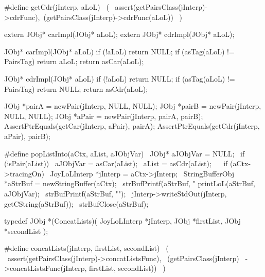 #define getCdr(jInterp, aLoL)               \
  (                                         \
    assert(getPairsClass(jInterp)->cdrFunc),\
    (getPairsClass(jInterp)->cdrFunc(aLoL)) \
  )
\stopCHeader

\startCHeader
extern JObj* carImpl(JObj* aLoL);
extern JObj* cdrImpl(JObj* aLoL);
\stopCHeader
{}

\startCCode
JObj* carImpl(JObj* aLoL) {
  if (!aLoL) return NULL;
  if (asTag(aLoL) != PairsTag) return aLoL;
  return asCar(aLoL);
}

JObj* cdrImpl(JObj* aLoL) {
  if (!aLoL) return NULL;
  if (asTag(aLoL) != PairsTag) return NULL;
  return asCdr(aLoL);
}
\stopCCode


\startCTest
  JObj *pairA = newPair(jInterp, NULL, NULL);
  JObj *pairB = newPair(jInterp, NULL, NULL);
  JObj *aPair = newPair(jInterp, pairA, pairB);
  AssertPtrEquals(getCar(jInterp, aPair), pairA);
  AssertPtrEquals(getCdr(jInterp, aPair), pairB);
\stopCTest
\stopTestCase
\stopTestSuite

\startTestSuite[popListInto]

\startCHeader
#define popListInto(aCtx, aList, aJObjVar)                \
  JObj* aJObjVar = NULL;                                  \
  if (isPair(aList)) {                                    \
    aJObjVar = asCar(aList);                              \
    aList    = asCdr(aList);                              \
  }                                                       \
  if (aCtx->tracingOn) {                                  \
    JoyLoLInterp *jInterp = aCtx->jInterp;                \
    StringBufferObj *aStrBuf = newStringBuffer(aCtx);     \
    strBufPrintf(aStrBuf, "%
    printLoL(aStrBuf, aJObjVar);                          \
    strBufPrintf(aStrBuf, "\n");                          \
    jInterp->writeStdOut(jInterp, getCString(aStrBuf));   \
    strBufClose(aStrBuf);                                 \
  }
\stopCHeader

\stopTestSuite

\startTestSuite[concatLists]
\startCHeader
typedef JObj *(ConcatLists)(
  JoyLoLInterp *jInterp,
  JObj         *firstList,
  JObj         *secondList
);

#define concatLists(jInterp, firstList, secondList)       \
  (                                                       \
    assert(getPairsClass(jInterp)->concatListsFunc),      \
    (getPairsClass(jInterp)                               \
      ->concatListsFunc(jInterp, firstList, secondList))  \
  )
\stopCHeader

